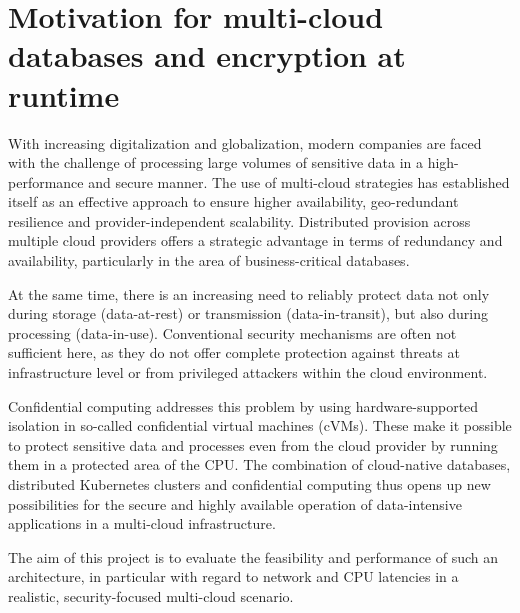 \section{Motivation for multi-cloud databases and encryption at runtime}
With increasing digitalization and globalization, modern companies are faced with the challenge of processing large volumes of sensitive data in a high-performance and secure manner. The use of multi-cloud strategies has established itself as an effective approach to ensure higher availability, geo-redundant resilience and provider-independent scalability. Distributed provision across multiple cloud providers offers a strategic advantage in terms of redundancy and availability, particularly in the area of business-critical databases.

At the same time, there is an increasing need to reliably protect data not only during storage (data-at-rest) or transmission (data-in-transit), but also during processing (data-in-use). Conventional security mechanisms are often not sufficient here, as they do not offer complete protection against threats at infrastructure level or from privileged attackers within the cloud environment.

Confidential computing addresses this problem by using hardware-supported isolation in so-called confidential virtual machines (cVMs). These make it possible to protect sensitive data and processes even from the cloud provider by running them in a protected area of the CPU. The combination of cloud-native databases, distributed Kubernetes clusters and confidential computing thus opens up new possibilities for the secure and highly available operation of data-intensive applications in a multi-cloud infrastructure.

The aim of this project is to evaluate the feasibility and performance of such an architecture, in particular with regard to network and CPU latencies in a realistic, security-focused multi-cloud scenario.

